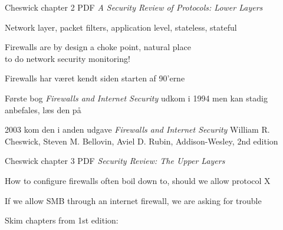 \documentclass[Screen16to9,17pt]{foils}
\begin{document}
\begin{list2}
\item {}
\item {} Cheswick chapter 2 PDF
\emph{A Security Review of Protocols:
Lower Layers}
\item Network layer, packet filters, application level, stateless, stateful
\end{list2}

Firewalls are by design a choke point, natural place \\
to do network security monitoring!




\begin{list1}
\item Firewalls har været kendt siden starten af 90'erne
\item Første bog \emph{Firewalls and Internet Security} udkom i 1994 men kan stadig anbefales, læs den på 

\item 2003 kom den i anden udgave \emph{Firewalls and Internet Security}
William R. Cheswick, Steven M. Bellovin, Aviel D. Rubin,
Addison-Wesley, 2nd edition
\end{list1}




\begin{list1}
\item {} Cheswick chapter 3 PDF
\emph{Security Review: The Upper Layers}
\begin{list2}
\item How to configure firewalls often boil down to, should we allow protocol X
\item If we allow SMB through an internet firewall, we are asking for trouble
\end{list2}
\end{list1}

Skim chapters from 1st edition:\\
\\ 
\end{document}
